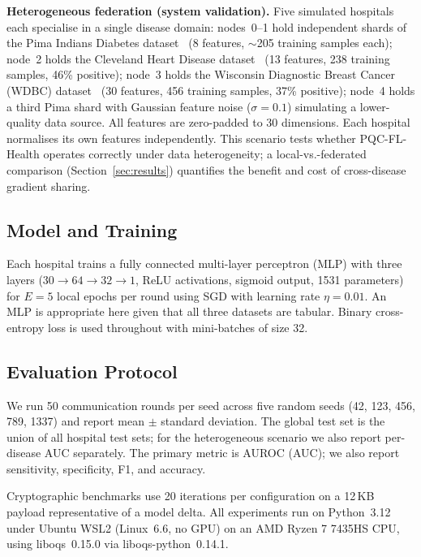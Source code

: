 \documentclass[runningheads]{llncs}
\begin{document}
\textbf{Heterogeneous federation (system validation).}
Five simulated hospitals each specialise in a single disease domain:
nodes~0--1 hold independent shards of the Pima Indians Diabetes
dataset~\cite{smith1988} (8 features, $\sim$205 training samples each);
node~2 holds the Cleveland Heart Disease
dataset~\cite{detrano1989} (13 features, 238 training samples, 46\%
positive); node~3 holds the Wisconsin Diagnostic Breast Cancer
(WDBC) dataset~\cite{street1993} (30 features, 456 training samples,
37\% positive); node~4 holds a third Pima shard with Gaussian
feature noise ($\sigma=0.1$) simulating a lower-quality data source.
All features are zero-padded to 30 dimensions.
Each hospital normalises its own features independently.
This scenario tests whether PQC-FL-Health operates correctly under
data heterogeneity; a local-vs.-federated comparison
(Section~\ref{sec:results}) quantifies the benefit and cost of
cross-disease gradient sharing.

\subsection{Model and Training}

Each hospital trains a fully connected multi-layer perceptron (MLP)
with three layers ($30 \to 64 \to 32 \to 1$, ReLU activations,
sigmoid output, 1531 parameters) for $E = 5$ local epochs per round
using SGD with learning rate $\eta = 0.01$.
An MLP is appropriate here given that all three datasets are tabular.
Binary cross-entropy loss is used throughout with mini-batches
of size 32.

\subsection{Evaluation Protocol}

We run 50 communication rounds per seed across five random seeds
(42, 123, 456, 789, 1337) and report mean $\pm$ standard deviation.
The global test set is the union of all hospital test sets; for the
heterogeneous scenario we also report per-disease AUC separately.
The primary metric is AUROC (AUC); we also report sensitivity,
specificity, F1, and accuracy.

Cryptographic benchmarks use 20 iterations per configuration on a
12\,KB payload representative of a model delta.
All experiments run on Python~3.12 under Ubuntu WSL2 (Linux~6.6,
no GPU) on an AMD Ryzen 7 7435HS CPU, using liboqs~0.15.0 via
liboqs-python~0.14.1.

\end{document}
